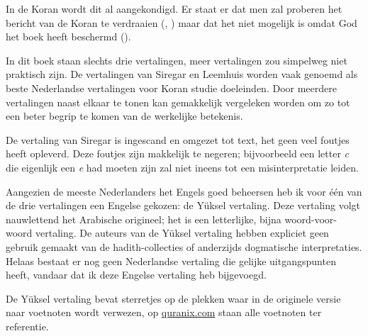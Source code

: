 In de Koran wordt dit al aangekondigd.  Er staat er dat men zal proberen het bericht van de Koran te verdraaien (, ) maar dat het niet mogelijk is omdat God het boek heeft beschermd ().
\vspace{0.3cm}

\newpage
\vspace{3cm}

\noindent In dit boek staan slechts drie vertalingen, meer vertalingen zou simpelweg niet praktisch zijn.  De vertalingen van Siregar en Leemhuis worden vaak genoemd als beste Nederlandse vertalingen voor Koran studie doeleinden.  Door meerdere vertalingen naast elkaar te tonen kan gemakkelijk vergeleken worden om zo tot een beter begrip te komen van de werkelijke betekenis.

De vertaling van Siregar is ingescand en omgezet tot text, het geen veel foutjes heeft opleverd.  Deze foutjes zijn makkelijk te negeren; bijvoorbeeld een letter \emph{c} die eigenlijk een \emph{e} had moeten zijn zal niet ineens tot een misinterpretatie leiden.

Aangezien de meeste Nederlanders het Engels goed beheersen heb ik voor één van de drie vertalingen een Engelse gekozen: de Yüksel vertaling.  Deze vertaling volgt nauwlettend het Arabische origineel; het is een letterlijke, bijna woord-voor-woord vertaling.  De auteurs van de Yüksel vertaling hebben expliciet geen gebruik gemaakt van de hadith-collecties of anderzijds dogmatische interpretaties.  Helaas bestaat er nog geen Nederlandse vertaling die gelijke uitgangspunten heeft, vandaar dat ik deze Engelse vertaling heb bijgevoegd.

De Yüksel vertaling bevat sterretjes op de plekken waar in de originele versie naar voetnoten wordt verwezen, op \href{http://quranix.com}{quranix.com} staan alle voetnoten ter referentie.
\vspace{0.3cm}

